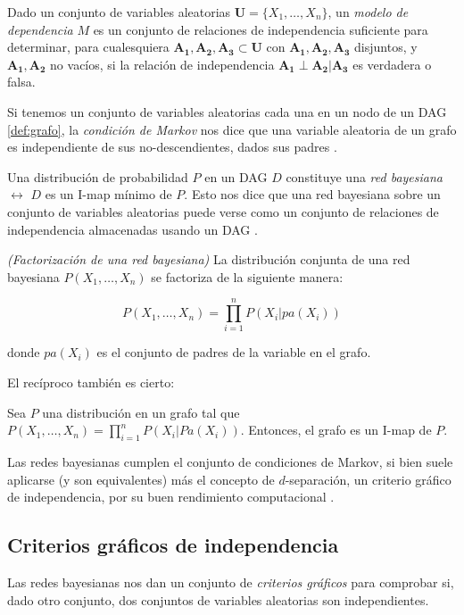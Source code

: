 Dado un conjunto de variables aleatorias $\mathbf{U} = \{X_1, \dots, X_n\}$, un {\em modelo de dependencia} $M$ 
es un conjunto de relaciones de independencia suficiente para determinar, para cualesquiera $\mathbf{A_1}, 
\mathbf{A_2}, \mathbf{A_3} \subset \mathbf{U}$ con $\mathbf{A_1}, \mathbf{A_2}, \mathbf{A_3}$
disjuntos, y $\mathbf{A_1}, \mathbf{A_2}$ no vacíos, si la relación de independencia $\mathbf{A_1} \perp 
\mathbf{A_2} | \mathbf{A_3}$ es verdadera o falsa. 

Si tenemos un conjunto de variables aleatorias cada una en un nodo de un DAG \ref{def:grafo}, la {\em condición 
de Markov} nos dice que una variable aleatoria de un grafo es independiente de sus no-descendientes, dados 
sus padres \cite{markov-assumption}. 

Una distribución de probabilidad $P$ en un DAG $D$ constituye una {\em red bayesiana} $\leftrightarrow$ $D$ es un 
I-map mínimo de $P$. Esto nos dice que una red bayesiana sobre un conjunto de variables aleatorias puede verse 
como un conjunto de relaciones de independencia almacenadas usando un DAG \cite{i-map}.

\begin{teorema}\emph{(Factorización de una red bayesiana)} 
La distribución conjunta de una red bayesiana $P(X_1, \dots, X_n)$ se factoriza de la siguiente manera:

$$P(X_1, \dots, X_n) = \prod_{i=1}^n P(X_i|pa(X_i))$$

donde $pa(X_i)$ es el conjunto de padres de la variable en el grafo. 
\end{teorema}

El recíproco también es cierto:

\begin{teorema} Sea $P$ una distribución en un grafo tal que $P(X_1, \dots, X_n) = \prod_{i=1}^n P(X_i|Pa(X_i))$. Entonces, el grafo es un I-map de $P$.
\end{teorema}

Las redes bayesianas cumplen el conjunto de condiciones de Markov, si bien suele aplicarse (y son equivalentes) 
más el concepto de $d$-separación, un criterio gráfico de independencia, por su buen rendimiento computacional 
\cite{pearl88}.

\subsection{Criterios gráficos de independencia}

Las redes bayesianas nos dan un conjunto de {\em criterios gráficos} para comprobar si, dado otro conjunto, dos 
conjuntos de variables aleatorias son independientes.

